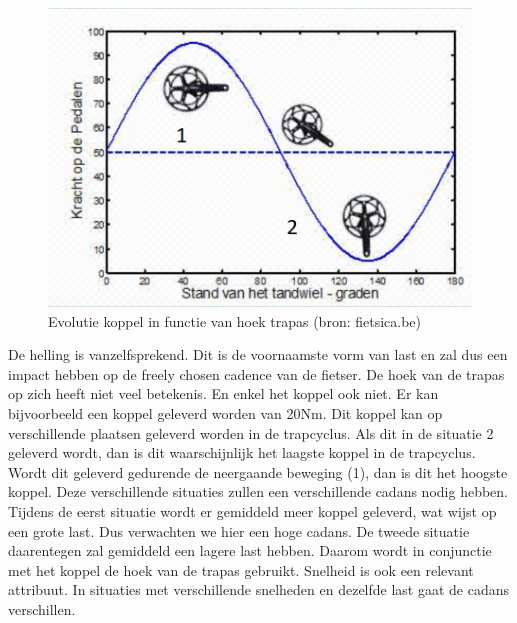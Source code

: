 \begin{figure}
  \centering
  \includegraphics[width=\linewidth]{images/trapcyclus.png}
  \caption{Evolutie koppel in functie van hoek trapas (bron: fietsica.be)}
  \label{fig:Evolutie koppel in functie van hoek trapas}
\end{figure}
\noindent De helling is vanzelfsprekend. Dit is de voornaamste vorm van last en zal dus een impact hebben op de freely chosen cadence van de fietser. De hoek van de trapas op zich heeft niet veel betekenis. En enkel het koppel ook niet. Er kan bijvoorbeeld een koppel geleverd worden van 20Nm. Dit koppel kan op verschillende plaatsen geleverd worden in de trapcyclus. Als dit in de situatie 2 geleverd wordt, dan is dit waarschijnlijk het laagste koppel in de trapcyclus. Wordt dit geleverd gedurende de neergaande beweging (1), dan is dit het hoogste koppel. Deze verschillende situaties zullen een verschillende cadans nodig hebben. Tijdens de eerst situatie wordt er gemiddeld meer koppel geleverd, wat wijst op een grote last. Dus verwachten we hier een hoge cadans. De tweede situatie daarentegen zal gemiddeld een lagere last hebben. Daarom wordt in conjunctie met het koppel de hoek van de trapas gebruikt. Snelheid is ook een relevant attribuut. In situaties met verschillende snelheden en dezelfde last gaat de cadans verschillen.
\newpage
